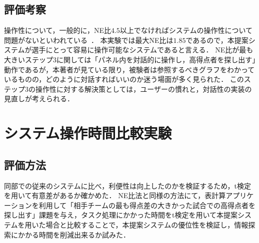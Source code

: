\documentclass[sotsuron]{kuee}
\begin{document}
		\subsection{評価考察}
			操作性について，一般的に，NE比$4.5$以上でなければシステムの操作性について問題がないといわれている~\cite{NEMratio}．
			本実験では最大NE比は$1.85$であるので，本提案システムが選手にとって容易に操作可能なシステムであると言える．
			NE比が最も大きいステップ3に関しては「パネル内を対話的に操作し，高得点者を探し出す」動作であるが，本著者が見ている限り，被験者は参照するべきグラフをわかっているものの，どのように対話すればいいのか迷う場面が多く見られた．
			このステップ3の操作性に対する解決策としては，ユーザーの慣れと，対話性の実装の見直しが考えられる．

	\section{システム操作時間比較実験}
		\subsection{評価方法}
			同部での従来のシステムに比べ，利便性は向上したのかを検証するため，t検定を用いて有意差があるか確かめた．
			NE比法と同様の方法にて，表計算アプリケーションを利用して「相手チームの最も得点差の大きかった試合での高得点者を探し出す」課題を与え，タスク処理にかかった時間をt検定を用いて本提案システムを用いた場合と比較することで，本提案システムの優位性を検証し，情報探索にかかる時間を削減出来るか試みた．
\end{document}
